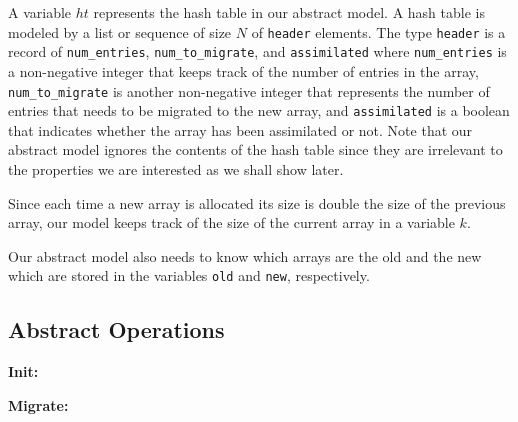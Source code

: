 A variable $ht$ represents the hash table in our abstract model.  A
hash table is modeled by a list or sequence of size $N$ of
\texttt{header} elements. The type \texttt{header} is a record of
\texttt{num\_entries}, \texttt{num\_to\_migrate}, and
\texttt{assimilated} where \texttt{num\_entries} is a non-negative
integer that keeps track of the number of entries in the array,
\texttt{num\_to\_migrate} is another non-negative integer that
represents the number of entries that needs to be migrated to the new
array, and \texttt{assimilated} is a boolean that indicates whether
the array has been assimilated or not. Note that our abstract model
ignores the contents of the hash table since they are irrelevant to
the properties we are interested as we shall show later.



Since each time a new array is allocated its size is double the size
of the previous array, our model keeps track of the size of the
current array in a variable $k$.

Our abstract model also needs to know which arrays are the old and the
new which are stored in the variables \texttt{old} and \texttt{new},
respectively.



\subsection{Abstract Operations}

\noindent \textbf{Init:} \vspace{1mm}

\begin{minipage}{\linewidth}
\end{minipage}

\noindent \textbf{Migrate:}  \vspace{1mm}

